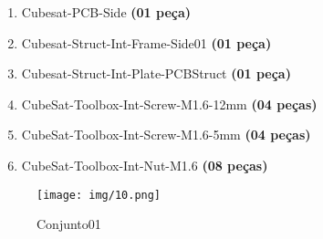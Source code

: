 \begin{enumerate}[label*=\ref*{subs:c10}\arabic*]
	\item Cubesat-PCB-Side \textbf{(01 peça)}
	\item Cubesat-Struct-Int-Frame-Side01 \textbf{(01 peça)}
	\item Cubesat-Struct-Int-Plate-PCBStruct \textbf{(01 peça)}
	\item CubeSat-Toolbox-Int-Screw-M1.6-12mm \textbf{(04 peças)}
	\item CubeSat-Toolbox-Int-Screw-M1.6-5mm \textbf{(04 peças)}
	\item CubeSat-Toolbox-Int-Nut-M1.6 \textbf{(08 peças)}
\end{enumerate}

\begin{figure}[ht!]
	\centering
	\texttt{[image: img/10.png]}
	\caption{Conjunto01}
	\label{10}
\end{figure}










%
%
%
%
%
%
%
%
%


